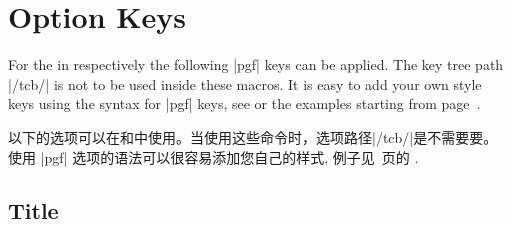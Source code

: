 \section{Option Keys}\label{sec:optkeys}%
%
For the  in  respectively 
the following |pgf| keys can be applied. The key tree path |/tcb/| is not to
be used inside these macros. It is easy to add your own style keys using
the syntax for |pgf| keys, see \cite{tantau:tikz_and_pgf,sturm:latex} or the examples
starting from page~\pageref{sec:latextutorial}.

以下的选项可以在和中使用。当使用这些命令时，选项路径|/tcb/|是不需要要。
使用 |pgf| 选项的语法可以很容易添加您自己的样式, 例子见~\pageref{sec:latextutorial}页的 \cite{tantau:tikz_and_pgf,sturm:latex} .


\subsection{Title}









  
